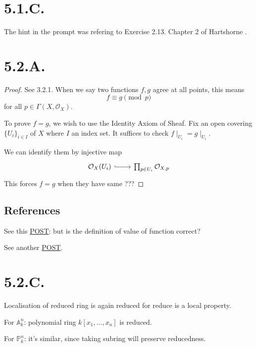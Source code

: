 \section{5.1.C.}

The hint in the prompt was refering to Exercise 2.13.  Chapter 2 of Hartshorne \cite{hartshorne2013algebraic}.

\section{5.2.A.}

\begin{proof}
    
See 3.2.1. When we say two functions $f,g$ agree at all points, this means 
\[f\equiv g\pmod{p}\] for all $p\in \Gamma(X,\mathcal O_X)$.    

To prove $f=g$, we wish to use the Identity Axiom of Sheaf. Fix an open covering $\{U_i\}_{i\in I}$ of $X$ where $I$ an index set. It suffices to check $f\mid_{U_i}=g\mid_{U_i}$.

We can identify them by injective map 
\[\begin{tikzcd}
	{\mathcal O_X(U_i)} & {\prod_{p\in U_i}\mathcal O_{X,p}}
	\arrow[hook, from=1-1, to=1-2]
\end{tikzcd}\]
This forces $f=g$ when they have same ???

\end{proof}

\subsection{References}

See this \href{https://math.stackexchange.com/questions/3834821/equality-of-functions-in-a-reduced-scheme}{POST}: but is the definition of value of function correct?

See another \href{https://math.stackexchange.com/questions/1157904/functions-on-reduced-schemes-are-determined-by-their-values-at-each-point}{POST}.

\section{5.2.C.}

Localisation of reduced ring is again reduced for reduce is a local property. 

For $\mathbb A^n_k$: 
polynomial ring $k[x_1,...,x_n]$ is reduced.

For $\mathbb P^n_k$: it's similar, since taking subring will preserve reducedness.